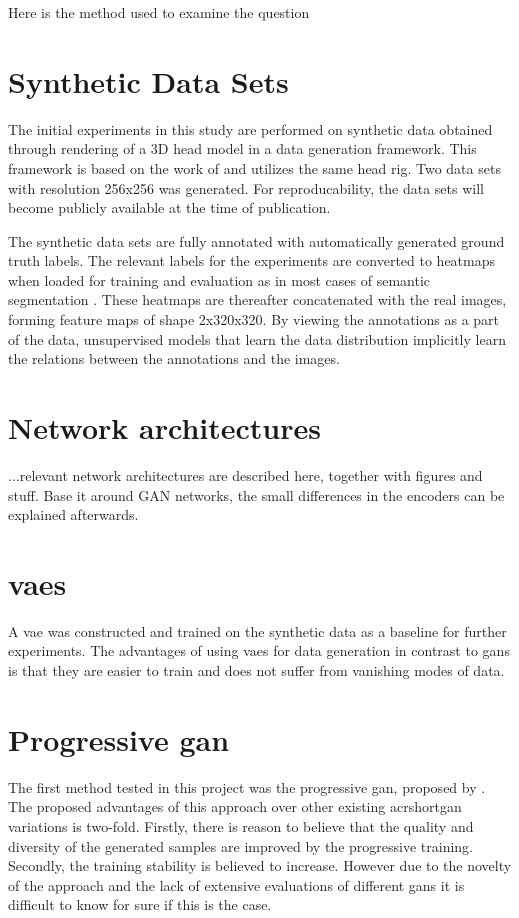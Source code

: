 Here is the method used to examine the question

\section{Synthetic Data Sets}
The initial experiments in this study are performed on synthetic data obtained through rendering of a 3D head model in a data generation framework. This framework is based on the work of \textcite{swirski2014rendering} and utilizes the same head rig. Two data sets with resolution 256x256 was generated. For reproducability, the data sets will become publicly available at the time of publication.

The synthetic data sets are fully annotated with automatically generated ground truth labels. The relevant labels for the experiments are converted to heatmaps when loaded for training and evaluation as in most cases of semantic segmentation \parencite{guo2017review}. These heatmaps are thereafter concatenated with the real images, forming feature maps of shape 2x320x320. By viewing the annotations as a part of the data, unsupervised models that learn the data distribution implicitly learn the relations between the annotations and the images.

\section{Network architectures}
...relevant network architectures are described here, together with figures and stuff. Base it around GAN networks, the small differences in the encoders can be explained afterwards.

\section{\acrlong{vaes}}
A \acrlong{vae} was constructed and trained on the synthetic data as a baseline for further experiments. The advantages of using \acrshort{vaes} for data generation in contrast to \acrshort{gans} is that they are easier to train and does not suffer from vanishing modes of data.


\section{Progressive \acrshort{gan}}
The first method tested in this project was the progressive \acrshort{gan}, proposed by \textcite{karras2017progressive}. The proposed advantages of this approach over other existing acrshort{gan} variations is two-fold. Firstly, there is reason to believe that the quality and diversity of the generated samples are improved by the progressive training. Secondly, the training stability is believed to increase. However due to the novelty of the approach and the lack of extensive evaluations of different \acrshort{gans} it is difficult to know for sure if this is the case.

